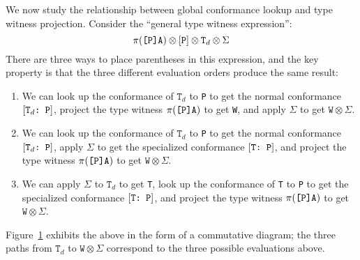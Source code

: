 \documentclass[../generics]{subfiles}
\begin{document}
We now study the relationship between global conformance lookup and type witness projection. Consider the ``general type witness expression'':
\[\pi(\texttt{[P]A})\otimes[\texttt{P}]\otimes\texttt{T}_d\otimes\Sigma\]
There are three ways to place parentheses in this expression, and the key property is that the three different evaluation orders produce the same result:
\begin{enumerate}
\item We can look up the conformance of $\texttt{T}_d$ to \texttt{P} to get the normal conformance $[\texttt{$\texttt{T}_d$:~P}]$, project the type witness $\pi(\texttt{[P]A})$ to get \texttt{W}, and apply $\Sigma$ to get $\texttt{W}\otimes\Sigma$.
\item We can look up the conformance of $\texttt{T}_d$ to \texttt{P} to get the normal conformance $[\texttt{$\texttt{T}_d$:~P}]$, apply $\Sigma$ to get the specialized conformance $[\texttt{T:~P}]$, and project the type witness $\pi(\texttt{[P]A})$ to get $\texttt{W}\otimes\Sigma$.
\item We can apply $\Sigma$ to $\texttt{T}_d$ to get \texttt{T}, look up the conformance of \texttt{T} to \texttt{P} to get the specialized conformance $[\texttt{T:~P}]$, and project the type witness $\pi(\texttt{[P]A})$ to get $\texttt{W}\otimes\Sigma$.
\end{enumerate}
Figure~\ref{type witness diagram} exhibits the above in the form of a commutative diagram; the three paths from $\texttt{T}_d$ to $\texttt{W}\otimes\Sigma$ correspond to the three possible evaluations above.

\begin{figure}\label{type witness diagram}
\begin{center}
\end{center}
\end{figure}
\end{document}
